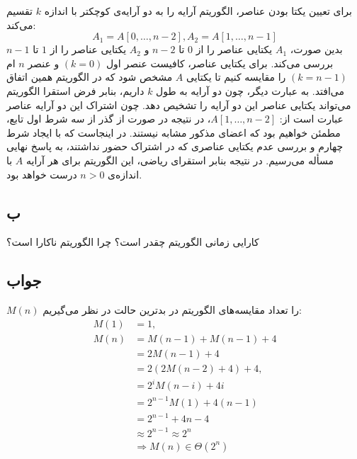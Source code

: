 \documentclass[]{article}
\begin{document}
برای تعیین یکتا بودن عناصر، الگوریتم آرایه را به دو آرایه‌ی کوچکتر با اندازه
$k$
تقسیم می‌کند:
$$A_1 = A[0, \ldots, n-2] , A_2 = A[1, \ldots, n-1]$$
بدین صورت،
$A_1$
یکتایی عناصر را از
$0$
تا
$n-2$
و
$A_2$
یکتایی عناصر را از
$1$
تا $n-1$
بررسی می‌کند.
برای یکتایی عناصر، کافیست عنصر اول
$(k=0)$
و عنصر
$n$
ام
$(k = n-1)$
را مقایسه کنیم تا یکتایی
$A$
مشخص شود که در الگوریتم همین اتفاق می‌افتد.
به عبارت دیگر، چون دو آرایه به طول
$k$
داریم، بنابر فرض استقرا الگوریتم می‌تواند یکتایی عناصر این دو آرایه را تشخیص دهد. چون اشتراک این دو آرایه عناصر عبارت است از:
$A[1, \ldots, n-2]$،
در نتیجه در صورت از گذر از سه شرط اول تابع، مطمئن خواهیم بود که اعضای مذکور مشابه نیستند. در اینجاست که با ایجاد شرط چهارم و بررسی عدم یکتایی عناصری که در اشتراک حضور نداشتند، به پاسخ نهایی مسأله می‌رسیم.
در نتیجه بنابر استقرای ریاضی، این الگوریتم برای هر آرایه
$A$
با اندازه‌ی
$n>0$
درست خواهد بود.

\subsection{ب}
کارایی زمانی الگوریتم چقدر است؟ چرا الگوریتم ناکارا است؟
\subsection*{جواب}
$M(n)$
را تعداد مقایسه‌های الگوریتم در بدترین حالت در نظر می‌گیریم:
\begin{align}
    M(1) &= 1,\\
    M(n) &= M(n-1) + M(n-1) + 4\\
    &= 2M(n-1) + 4 \\
    &= 2(2M(n-2) + 4) + 4,\\
    &= 2^iM(n-i) + 4i\\
    &= 2^{n-1}M(1) + 4(n-1)\\
    &= 2^{n-1} + 4n - 4\\
    &\approx 2^{n-1} \approx 2^n\\
    &\Rightarrow M(n) \in \Theta(2^n)
\end{align}
\end{document}
